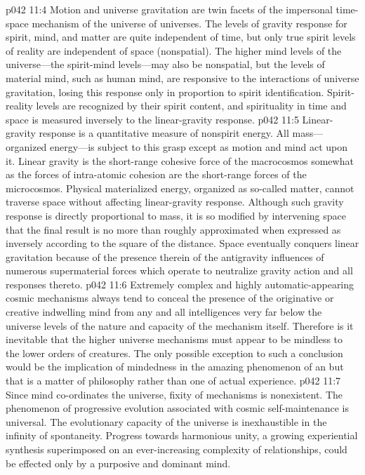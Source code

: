 \pc \vs p042 11:4 Motion and universe gravitation are twin facets of the impersonal time\hyp{}space mechanism of the universe of universes. The levels of gravity response for spirit, mind, and matter are quite independent of time, but only true spirit levels of reality are independent of space (nonspatial). The higher mind levels of the universe---the spirit\hyp{}mind levels---may also be nonspatial, but the levels of material mind, such as human mind, are responsive to the interactions of universe gravitation, losing this response only in proportion to spirit identification. Spirit\hyp{}reality levels are recognized by their spirit content, and spirituality in time and space is measured inversely to the linear\hyp{}gravity response.\plusone
\vs p042 11:5 Linear\hyp{}gravity response is a quantitative measure of nonspirit energy. All mass---organized energy---is subject to this grasp except as motion and mind act upon it. Linear gravity is the short\hyp{}range cohesive force of the macrocosmos somewhat as the forces of intra\hyp{}atomic cohesion are the short\hyp{}range forces of the microcosmos. Physical materialized energy, organized as so\hyp{}called matter, cannot traverse space without affecting linear\hyp{}gravity response. Although such gravity response is directly proportional to mass, it is so modified by intervening space that the final result is no more than roughly approximated when expressed as inversely according to the square of the distance. Space eventually conquers linear gravitation because of the presence therein of the antigravity influences of numerous supermaterial forces which operate to neutralize gravity action and all responses thereto.
\pc \vs p042 11:6 Extremely complex and highly automatic\hyp{}appearing cosmic mechanisms always tend to conceal the presence of the originative or creative indwelling mind from any and all intelligences very far below the universe levels of the nature and capacity of the mechanism itself. Therefore is it inevitable that the higher universe mechanisms must appear to be mindless to the lower orders of creatures. The only possible exception to such a conclusion would be the implication of mindedness in the amazing phenomenon of an but that is a matter of philosophy rather than one of actual experience.
\vs p042 11:7 Since mind co\hyp{}ordinates the universe, fixity of mechanisms is nonexistent. The phenomenon of progressive evolution associated with cosmic self\hyp{}maintenance is universal. The evolutionary capacity of the universe is inexhaustible in the infinity of spontaneity. Progress towards harmonious unity, a growing experiential synthesis superimposed on an ever\hyp{}increasing complexity of relationships, could be effected only by a purposive and dominant mind.
